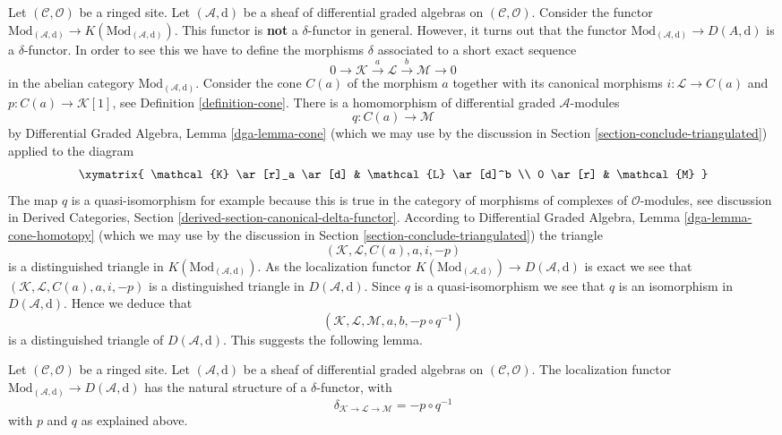 \noindent
Let $(\mathcal{C}, \mathcal{O})$ be a ringed site. Let
$(\mathcal{A}, \text{d})$ be a sheaf of differential graded algebras
on $(\mathcal{C}, \mathcal{O})$.
Consider the functor
$\text{Mod}_{(\mathcal{A}, \text{d})} \to
K(\text{Mod}_{(\mathcal{A}, \text{d})})$.
This functor is {\bf not} a $\delta$-functor in general.
However, it turns out that the functor
$\text{Mod}_{(\mathcal{A}, \text{d})} \to D(A, \text{d})$ is a
$\delta$-functor. In order to see this we have to define
the morphisms $\delta$ associated to a short exact sequence
$$
0 \to \mathcal{K} \xrightarrow{a} \mathcal{L} \xrightarrow{b} \mathcal{M} \to 0
$$
in the abelian category $\text{Mod}_{(\mathcal{A}, \text{d})}$.
Consider the cone $C(a)$ of the morphism $a$ together with its
canonical morphisms $i : \mathcal{L} \to C(a)$ and
$p : C(a) \to \mathcal{K}[1]$, see Definition \ref{definition-cone}.
There is a homomorphism of differential graded $\mathcal{A}$-modules
$$
q : C(a) \longrightarrow \mathcal{M}
$$
by Differential Graded Algebra, Lemma \ref{dga-lemma-cone}
(which we may use by the discussion in
Section \ref{section-conclude-triangulated})
applied to the diagram
$$
\xymatrix{
\mathcal{K} \ar[r]_a \ar[d] &
\mathcal{L} \ar[d]^b \\
0 \ar[r] &
\mathcal{M}
}
$$
The map $q$ is a quasi-isomorphism for example because this is true in
the category of morphisms of complexes of $\mathcal{O}$-modules, see
discussion in
Derived Categories, Section \ref{derived-section-canonical-delta-functor}.
According to Differential Graded Algebra, Lemma \ref{dga-lemma-cone-homotopy}
(which we may use by the discussion in
Section \ref{section-conclude-triangulated})
the triangle
$$
(\mathcal{K}, \mathcal{L}, C(a), a, i, -p)
$$
is a distinguished triangle in $K(\text{Mod}_{(\mathcal{A}, \text{d})})$.
As the localization functor
$K(\text{Mod}_{(\mathcal{A}, \text{d})}) \to D(\mathcal{A}, \text{d})$ is
exact we see that $(\mathcal{K}, \mathcal{L}, C(a), a, i, -p)$
is a distinguished
triangle in $D(\mathcal{A}, \text{d})$. Since $q$ is a quasi-isomorphism
we see that $q$ is an isomorphism in $D(\mathcal{A}, \text{d})$.
Hence we deduce that
$$
(\mathcal{K}, \mathcal{L}, \mathcal{M}, a, b, -p \circ q^{-1})
$$
is a distinguished triangle of $D(\mathcal{A}, \text{d})$.
This suggests the following lemma.

\begin{lemma}
\label{lemma-derived-canonical-delta-functor}
Let $(\mathcal{C}, \mathcal{O})$ be a ringed site. Let
$(\mathcal{A}, \text{d})$ be a sheaf of differential graded algebras
on $(\mathcal{C}, \mathcal{O})$. The localization functor
$\text{Mod}_{(\mathcal{A}, \text{d})} \to D(\mathcal{A}, \text{d})$
has the natural structure of a $\delta$-functor, with
$$
\delta_{\mathcal{K} \to \mathcal{L} \to \mathcal{M}} = - p \circ q^{-1}
$$
with $p$ and $q$ as explained above.
\end{lemma}

